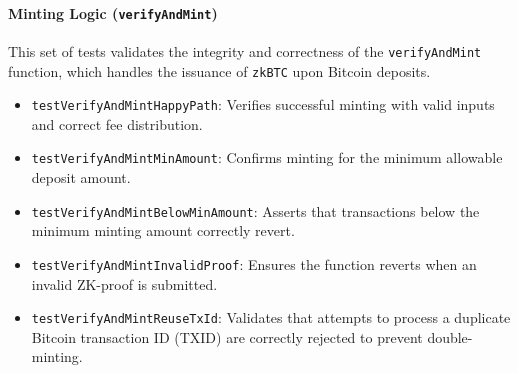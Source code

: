 \documentclass{DESSThesis}
\newcommand{\zktoken}{\texttt{zkBTC}}
\begin{document}
\paragraph{Minting Logic (\texttt{verifyAndMint})}
This set of tests validates the integrity and correctness of the \texttt{verifyAndMint} function, which handles the issuance of \texttt{\zktoken} upon Bitcoin deposits.
\begin{itemize}
    \item \texttt{testVerifyAndMintHappyPath}: Verifies successful minting with valid inputs and correct fee distribution.
    \item \texttt{testVerifyAndMintMinAmount}: Confirms minting for the minimum allowable deposit amount.
    \item \texttt{testVerifyAndMintBelowMinAmount}: Asserts that transactions below the minimum minting amount correctly revert.
    \item \texttt{testVerifyAndMintInvalidProof}: Ensures the function reverts when an invalid ZK-proof is submitted.
    \item \texttt{testVerifyAndMintReuseTxId}: Validates that attempts to process a duplicate Bitcoin transaction ID (TXID) are correctly rejected to prevent double-minting.
\end{itemize}
\end{document}
